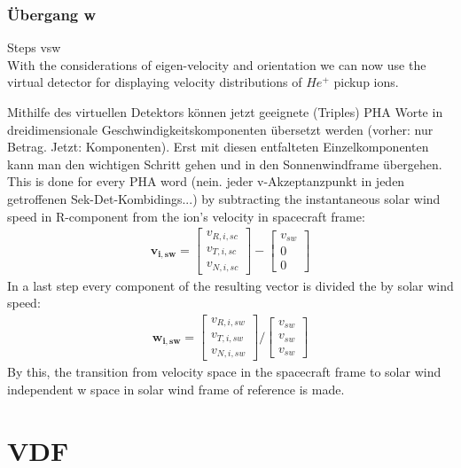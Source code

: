 \subsubsection{Übergang w}
Steps vsw
\\
With the considerations of eigen-velocity and orientation we can now use the virtual detector for displaying velocity distributions of $He^{+}$ pickup ions. 

Mithilfe des virtuellen Detektors können jetzt geeignete (Triples) PHA Worte in dreidimensionale Geschwindigkeitskomponenten übersetzt werden (vorher: nur Betrag. Jetzt: Komponenten).
Erst mit diesen entfalteten Einzelkomponenten kann man den wichtigen Schritt gehen und in den Sonnenwindframe übergehen.
This is done for every PHA word (nein. jeder v-Akzeptanzpunkt in jeden getroffenen Sek-Det-Kombidings...) by subtracting the instantaneous solar wind speed in R-component from the ion's velocity in spacecraft frame: 
\begin{align*}
\mathbf{v_{i,sw}} = \begin{bmatrix}v_{R,i,sc}\\v_{T,i,sc}\\v_{N,i,sc}\end{bmatrix} - \begin{bmatrix}v_{sw}\\0\\0\end{bmatrix}
\end{align*}
In a last step every component of the resulting vector is divided the by solar wind speed:
\begin{align*}
\mathbf{w_{i,sw}} = \begin{bmatrix}v_{R,i,sw}\\v_{T,i,sw}\\v_{N,i,sw}\end{bmatrix} / \begin{bmatrix}v_{sw}\\v_{sw}\\v_{sw}\end{bmatrix}
\end{align*}
By this, the transition from velocity space in the spacecraft frame to solar wind independent w space in solar wind frame of reference is made.
%
%
%
\section{VDF}

%
